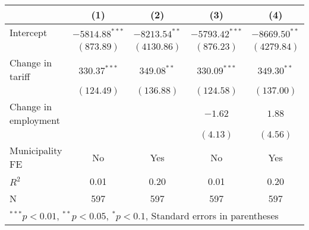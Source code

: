 
\begin{tabular}{l c c c c }
\hline
 & (1) & (2) & (3) & (4) \\
\hline
Intercept & $-5814.88^{***}$ & $-8213.54^{**}$ & $-5793.42^{***}$ & $-8669.50^{**}$ \\
            & $(873.89)$       & $(4130.86)$     & $(876.23)$       & $(4279.84)$     \\
Change in tariff     & $330.37^{***}$   & $349.08^{**}$   & $330.09^{***}$   & $349.30^{**}$   \\
            & $(124.49)$       & $(136.88)$      & $(124.58)$       & $(137.00)$      \\
Change in employment     &                  &                 & $-1.62$          & $1.88$          \\
            &                  &                 & $(4.13)$         & $(4.56)$        \\
\hline
Municipality FE          & No       & Yes       & No          & Yes              \\ 
\hline
$R^2$       & 0.01             & 0.20            & 0.01             & 0.20            \\
N           & 597              & 597             & 597              & 597             \\
\hline
\multicolumn{5}{l}{\scriptsize{$^{***}p<0.01$, $^{**}p<0.05$, $^*p<0.1$, Standard errors in parentheses}}
\end{tabular}
